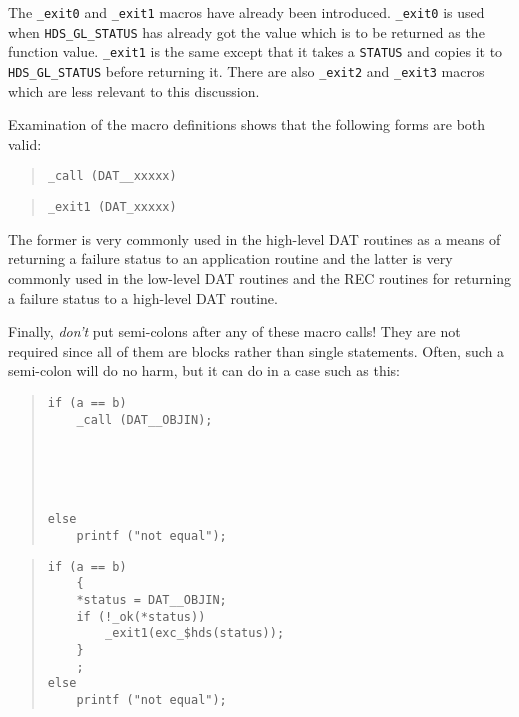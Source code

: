 The {\tt \_exit0} and {\tt \_exit1} macros have already been introduced.
{\tt \_exit0} is used when {\tt HDS\_GL\_STATUS} has already got the value
which is to be returned as the function value. {\tt \_exit1} is the same
except that it takes a {\tt STATUS} and copies it to {\tt HDS\_GL\_STATUS}
before returning it. There are also {\tt \_exit2} and {\tt \_exit3} macros
which are less relevant to this discussion.

Examination of the macro definitions shows that the following forms are
both valid:

\begin {minipage}[t]{80mm}
\begin {quote}
\begin {verbatim}
_call (DAT__xxxxx)
\end{verbatim}
\end {quote}
\end {minipage}
\begin {minipage}[t]{80mm}
\begin {quote} 
\begin {verbatim}
_exit1 (DAT_xxxxx)
\end{verbatim}
\end {quote}
\end {minipage}

The former is very commonly used in the high-level DAT routines as a means of
returning a failure status to an application routine and the latter is very
commonly used in the low-level DAT routines and the REC routines for returning
a failure status to a high-level DAT routine.

Finally, {\em don't} put semi-colons after any of these macro calls! They
are not required since all of them are blocks rather than single statements.
Often, such a semi-colon will do no harm, but it can do in a case such
as this:

\begin {minipage}[t]{80mm}
\begin {quote}
\begin {verbatim}
if (a == b)
    _call (DAT__OBJIN);





else
    printf ("not equal");
\end{verbatim}
\end {quote}
\end {minipage}
\begin {minipage}[t]{80mm}
\begin {quote} 
\begin {verbatim}
if (a == b)
    {
    *status = DAT__OBJIN;
    if (!_ok(*status))
        _exit1(exc_$hds(status));
    }
    ;
else
    printf ("not equal");
\end{verbatim}
\end {quote}
\end {minipage}

